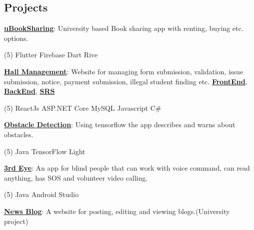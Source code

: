 \documentclass[mm]{simple_style}
\let\oldhref\href
\renewcommand{\href}[2]{\oldhref{#1}{\bfseries#2}}
\begin{document}
\begin{resume}
\section{Projects}
{\href{https://github.com/Sourav9063/uBookSharing}{uBookSharing}}: University based Book sharing app with renting, buying etc. options.\\
\vspace{-4mm}
\begin{tasks}[style=itemize ,label=\textcolor{gray}{$\bullet$}](5)
\task Flutter
\task Firebase
\task Dart
\task Rive
\end{tasks}
\vspace{-2mm}
\href{https://sourav9063.github.io/hall_management_rf/}{Hall Management}: Website for managing form submission, validation, issue submission, notice, payment submission, illegal student finding etc. \href{https://github.com/Sourav9063/hall_management_rf}{FrontEnd}, \href{https://github.com/Sourav9063/Backend_hall_management}{BackEnd},
\href{https://docs.google.com/document/d/1Sy9VO97rWJrOYCMgWRGJz4H2q3vJPSVCpLRm5AUOsO8/edit?usp=sharing}{SRS}\\
\vspace{-4mm}
\begin{tasks}[style=itemize ,label=\textcolor{gray}{$\bullet$}](5)
\task ReactJs 
\task ASP.NET Core
\task MySQL 
\task Javascript
\task  C{\lserif\#}
\end{tasks}
\vspace{-2mm}
\href{https://github.com/Sourav9063/obstacles_detection}{Obstacle Detection}: Using tensorflow the app describes and warns about obstacles.\\
\vspace{-4mm}
\begin{tasks}[style=itemize ,label=\textcolor{gray}{$\bullet$}](5)
\task Java
\task TensorFlow Light
\end{tasks}
\vspace{-2mm}
\href{https://github.com/Sourav9063/3rdEye}{3rd Eye}: An app for blind people that can work with voice command, can read anything, has SOS and volunteer video calling.
\vspace{-4mm}
\begin{tasks}[style=itemize ,label=\textcolor{gray}{$\bullet$}](5)
\task[] \hspace
\task[] \hspace
\task Java
\task Android Studio
\end{tasks}
\vspace{-2mm}
\href{https://github.com/Sourav9063/Blog-CRUD-by-Nodejs}{News Blog}: A website for posting, editing and viewing blogs.(University project)\\

\end{resume}
\end{document}
